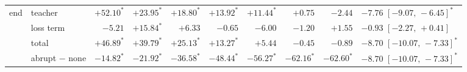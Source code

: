 \begin{tabular}{@{}llrrrrrrr l@{}}
end  & teacher          & $+52.10^{*}$ & $+23.95^{*}$ & $+18.80^{*}$ & $+13.92^{*}$ & $+11.44^{*}$ & $+0.75$ & $-2.44$ & $\mathbf{-7.76}$ $[-9.07,\,-6.45]^*$\\
     & loss term        & $-5.21$ & $+15.84^{*}$ & $+6.33$ & $-0.65$ & $-6.00$ & $-1.20$ & $+1.55$ & $-0.93$ $[-2.27,\,+0.41]$\\
     & total            & $+46.89^{*}$ & $+39.79^{*}$ & $+25.13^{*}$ & $+13.27^{*}$ & $+5.44$ & $-0.45$ & $-0.89$ & $\mathbf{-8.70}$ $[-10.07,\,-7.33]^*$\\
     & abrupt $-$ none  & $-14.82^{*}$ & $-21.92^{*}$ & $-36.58^{*}$ & $-48.44^{*}$ & $-56.27^{*}$ & $-62.16^{*}$ & $-62.60^{*}$ & $\mathbf{-8.70}$ $[-10.07,\,-7.33]^*$\\
\bottomrule
\end{tabular}
